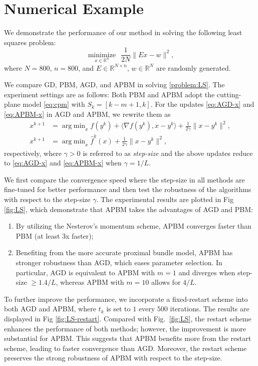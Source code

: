 \documentclass[letterpaper, 10 pt, conference]{ieeeconf}  %
\begin{document}
\section{Numerical Example}\label{sec:numrical}
We demonstrate the performance of our method in solving the following least squares problem:
\begin{equation}\label{problem:LS}
    \underset{x\in\mathbb{R}^n}{\operatorname{minimize}}~~\frac{1}{2N}\|Ex-w\|^2,
\end{equation}
where $N=800$, $n=800$, and $E\in\mathbb{R}^{N\times n}$, $w\in \mathbb{R}^{N}$ are randomly generated.

We compare GD, PBM, AGD, and APBM in solving \eqref{problem:LS}. The experiment settings are as follows: Both PBM and APBM adopt the cutting-plane model \eqref{eq:cpm} with $S_k=[k-m+1,k]$. For the updates \eqref{eq:AGD-x} and \eqref{eq:APBM-x} in AGD and APBM, we rewrite them as
\begin{align*}
    x^{k+1} &= \operatorname{\arg\;\min}_x f(y^k)\!+\!\langle\nabla f(y^k),x\!-\!y^k\rangle \!+\!\frac{1}{2\gamma}\|x\!-\!y^k\|^2,\\
    x^{k+1} &= \operatorname{\arg\;\min}_x \hat{f}^k(x)+\frac{1}{2\gamma}\|x-y^k\|^2,
\end{align*}
respectively, where $\gamma>0$ is referred to as \emph{step-size} and the above updates reduce to \eqref{eq:AGD-x} and \eqref{eq:APBM-x} when $\gamma=1/L$.

We first compare the convergence speed where the step-size in all methods are fine-tuned for better performance and then test the robustness of the algorithms with respect to the step-size $\gamma$. The experimental results are plotted in Fig \ref{fig:LS}, which demonstrate that APBM takes the advantages of AGD and PBM:
\begin{enumerate}[label=\arabic*)]
    \item By utilizing the Nesterov's momentum scheme, APBM converges faster than PBM (at least 3x faster);
    \item Benefiting from the more accurate proximal bundle model, APBM has stronger robustness than AGD, which eases parameter selection. In particular, AGD is equivalent to APBM with $m=1$ and diverges when step-size $\geq 1.4/L$, whereas APBM with $m = 10$ allows for $4/L$.
\end{enumerate}

To further improve the performance, we incorporate a fixed-restart scheme \cite{o2015adaptive} into both AGD and APBM, where $t_k$ is set to $1$ every $500$ iterations. The results are displayed in Fig \ref{fig:LS-restart}. Compared with Fig.~\ref{fig:LS}, the restart scheme enhances the performance of both methods; however, the improvement is more substantial for APBM. This suggests that APBM benefits more from the restart scheme, leading to faster convergence than AGD. Moreover, the restart scheme preserves the strong robustness of APBM with respect to the step-size.
\end{document}

